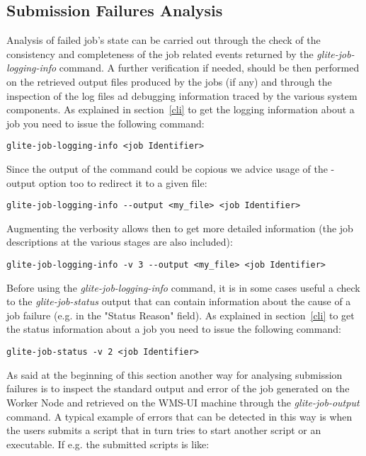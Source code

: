 
\subsection{Submission Failures Analysis}

Analysis of failed job's state can be carried out through the check of the consistency and completeness of the 
job related events returned by the \textit{glite-job-logging-info} command. A further verification if needed, should be 
then performed on the retrieved output files produced by the jobs (if any) and through the inspection of the log 
files ad debugging information traced by the various system components.
As explained in section~\ref{cli} to get the logging information about a job you need to issue the following command:

\smallskip
{\scriptsize{\verb!glite-job-logging-info <job Identifier>!}}
\smallskip


Since the output of the command could be copious we advice usage of the -output option too to redirect it 
to a given file:

\smallskip
{\scriptsize{\verb!glite-job-logging-info --output <my_file> <job Identifier>!}}
\smallskip

Augmenting the verbosity allows then to get more detailed information (the job descriptions at the various stages are 
also included):

\smallskip
{\scriptsize{\verb!glite-job-logging-info -v 3 --output <my_file> <job Identifier>!}}
\smallskip

Before using the \textit{glite-job-logging-info} command, it is in some cases useful a check to the \textit{glite-job-status} 
output that can contain information about the cause of a job failure (e.g. in the "Status Reason" field). 
As explained in section~\ref{cli} to get the status information about a job you need to issue the following command:

\smallskip
{\scriptsize{\verb!glite-job-status -v 2 <job Identifier>!}}
\smallskip

As said at the beginning of this section another way for analysing submission failures is to inspect the standard output 
and error of the job generated on the Worker Node and retrieved on the WMS-UI machine through the \textit{glite-job-output} 
command.  A typical example of errors that can be detected in this way is when the users submits a script that in turn 
tries to start another script or an executable. If e.g. the submitted scripts is like:


